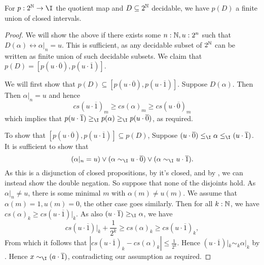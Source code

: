 \begin{lemma}\label{ImageDecidableClosedInterval}
  For $p:2^\N \to \I$ the quotient map and $D\subseteq 2^{\mathbb{N}}$ decidable, we have $p(D)$ a finite union of closed intervals. 
\end{lemma}
\begin{proof}
  We will show the above if there exists some $n:\mathbb{N}, u:2^n$ such that $D(\alpha) \leftrightarrow \alpha|_n = u$.
  This is sufficient, as any decidable subset of $2^{\mathbb{N}}$ can be written as finite union of such decidable subsets. 
  We claim that $p(D) = [p(u\cdot \overline 0) , p(u \cdot \overline 1)]$. 
\item 
  We will first show that $p(D) \subseteq [p(u\cdot \overline 0) , p(u \cdot \overline 1)]$. 
  Suppose $D(\alpha)$. Then 
  Then $\alpha|_n = u$ and hence 
  \begin{equation}
    cs(u\cdot \overline 1)_m \geq 
    cs(\alpha)_m \geq 
    cs(u\cdot\overline 0)_m
  \end{equation}
 which implies that $p(u\cdot \overline 1) \geq_\I p(\alpha) \geq_\I p(u\cdot\overline 0)$, as required. 
\item 
  To show that $[p(u\cdot \overline 0) , p(u \cdot \overline 1)]\subseteq p(D)$, 
  Suppose
  $(u\cdot \overline 0) \leq_\I \alpha \leq_\I (u \cdot \overline 1)$. 
  It is sufficient to show that 
  $$(\alpha|_n = u )\vee (\alpha \sim_\I u \cdot \overline 0 )\vee (\alpha \sim_\I u \cdot \overline 1).$$
  As this is a disjunction of closed propositions, by  it's closed, and by 
  , we can instead show the double negation. 
  So suppose that none of the disjoints hold. 
  As $\alpha|_n \neq u$, there is some minimal $m$ with $\alpha(m) \neq u(m)$. 
  We assume that $\alpha(m) = 1, u(m) = 0$, the other case goes similarly. 
  Then for all $k:\mathbb{N}$, we have 
  $cs(\alpha)_k \geq cs(u \cdot \overline 1)|_k$. 
  As also 
  $(u\cdot \overline 1)\geq_\I \alpha$, we have 
  $$cs(u \cdot \overline 1)|_k + \frac{1}{2^k} \geq cs(\alpha)_k \geq cs(u\cdot \overline 1)_k,$$
  From which it follows that $|cs(u\cdot\overline 1)_k - cs(\alpha)_k|\leq \frac{1}{2^k}$. 
  Hence $(u\cdot \overline 1)|_k \sim_k \alpha|_k$ by . 
  Hence $x\sim_\I (a\cdot\overline 1)$, contradicting our assumption as required. 
\end{proof}

